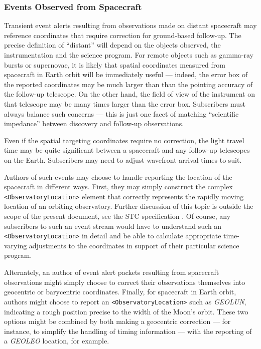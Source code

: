 \documentclass[11pt,a4paper]{ivoa}
\begin{document}
\subsubsection{Events Observed from Spacecraft}
\label{sec:3.4.5}
Transient event alerts resulting from observations made on distant spacecraft 
may reference coordinates that require correction for ground-based follow-up. 
The precise definition of ``distant'' will depend on the objects observed, the 
instrumentation and the science program. For remote objects such as gamma-ray 
bursts or supernovae, it is likely that spatial coordinates measured from 
spacecraft in Earth orbit will be immediately useful --- indeed, the error box 
of the reported coordinates may be much larger than than the pointing accuracy 
of the follow-up telescope. On the other hand, the field of view of the 
instrument on that telescope may be many times larger than the error box. 
Subscribers must always balance such concerns --- this is just one facet of 
matching ``scientific impedance'' between discovery and follow-up observations. 

Even if the spatial targeting coordinates require no correction, the light 
travel time may be quite significant between a spacecraft and any follow-up 
telescopes on the Earth. Subscribers may need to adjust wavefront arrival times 
to suit. 

Authors of such events may choose to handle reporting the location of the 
spacecraft in different ways. First, they may simply construct the complex {\tt 
<ObservatoryLocation>} element that correctly represents the rapidly moving 
location of an orbiting observatory. Further discussion of this topic is outside 
the scope of the present document, see the STC specification 
\citep{2007ivoa.spec.1030R}. Of course, any subscribers to such an event stream 
would have to understand such an {\tt <ObservatoryLocation>} in detail and be 
able to calculate appropriate time-varying adjustments to the coordinates in 
support of their particular science program. 

Alternately, an author of event alert packets resulting from spacecraft 
observations might simply choose to correct their observations themselves into 
geocentric or barycentric coordinates. Finally, for spacecraft in Earth orbit, 
authors might choose to report an {\tt <ObservatoryLocation>} such as 
\emph{GEOLUN}, indicating a rough position precise to the width of the Moon's 
orbit. These two options might be combined by both making a geocentric 
correction --- for instance, to simplify the handling of timing information --- 
with the reporting of a \emph{GEOLEO} location, for example. 
\end{document}
